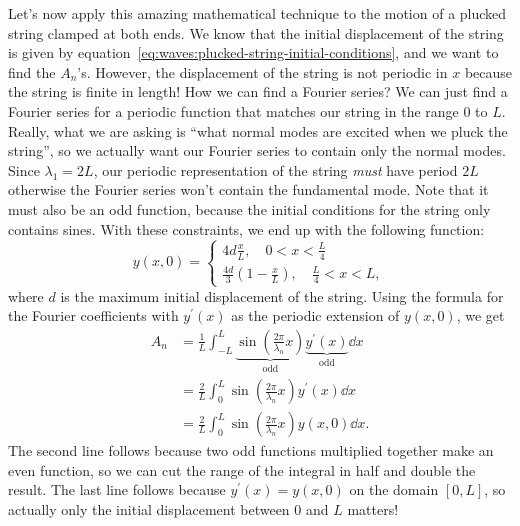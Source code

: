 \documentclass[../classical_mechanics.tex]{subfiles}
\begin{document}
        Let's now apply this amazing mathematical technique to the motion of a plucked string clamped at both ends.
        We know that the initial displacement of the string is given by equation~\ref{eq:waves:plucked-string-initial-conditions}, and we want to find the $A_n$'s.
        However, the displacement of the string is not periodic in $x$ because the string is finite in length!
        How we can find a Fourier series?
        We can just find a Fourier series for a periodic function that matches our string in the range $0$ to $L$.
        Really, what we are asking is ``what normal modes are excited when we pluck the string'', so we actually want our Fourier series to contain only the normal modes.
        Since $\lambda_1=2L$, our periodic representation of the string \textit{must} have period $2L$ otherwise the Fourier series won't contain the fundamental mode.
        Note that it must also be an odd function, because the initial conditions for the string only contains sines.
        With these constraints, we end up with the following function:
        \begin{equation}
            y(x,0)=\begin{cases}
                4d\frac{x}{L},\quad 0<x<\frac{L}{4}\\
                \frac{4d}{3}\left(1-\frac{x}{L}\right),\quad\frac{L}{4}<x<L,
            \end{cases}
        \end{equation}
        where $d$ is the maximum initial displacement of the string.
        Using the formula for the Fourier coefficients with $y^\prime(x)$ as the periodic extension of $y(x,0)$, we get
        \begin{align}
            A_n&=\frac{1}{L}\int_{-L}^L\underbrace{\sin\left(\frac{2\pi}{\lambda_n}x\right)}_\text{odd}\underbrace{y^\prime(x)}_\text{odd}\dd{x}\\
            &=\frac{2}{L}\int_0^L\sin\left(\frac{2\pi}{\lambda_n}x\right)y^\prime(x)\dd{x}\\
            &=\frac{2}{L}\int_0^L\sin\left(\frac{2\pi}{\lambda_n}x\right)y(x,0)\dd{x}.
        \end{align}
        The second line follows because two odd functions multiplied together make an even function, so we can cut the range of the integral in half and double the result.
        The last line follows because $y^\prime(x)=y(x,0)$ on the domain $[0,L]$, so actually only the initial displacement between $0$ and $L$ matters!
\end{document}
